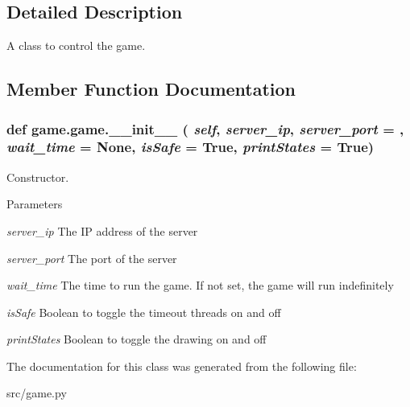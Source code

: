 \subsection{Detailed Description}
A class to control the game. 

\subsection{Member Function Documentation}
\hypertarget{classgame_1_1game_ab012f4d82441309ba1c14872d3ca646d}{
\subsubsection[{\_\-\_\-init\_\-\_\-}]{\setlength{\rightskip}{0pt plus 5cm}def game.game.\_\-\_\-init\_\-\_\- ( {\em self}, \/   {\em server\_\-ip}, \/   {\em server\_\-port} = {}, \/   {\em wait\_\-time} = {\ttfamily None}, \/   {\em isSafe} = {\ttfamily True}, \/   {\em printStates} = {\ttfamily True})}}
\label{classgame_1_1game_ab012f4d82441309ba1c14872d3ca646d}


Constructor. 


\begin{DoxyParams}{Parameters}
\item[{\em server\_\-ip}]The IP address of the server \item[{\em server\_\-port}]The port of the server \item[{\em wait\_\-time}]The time to run the game. If not set, the game will run indefinitely \item[{\em isSafe}]Boolean to toggle the timeout threads on and off \item[{\em printStates}]Boolean to toggle the drawing on and off \end{DoxyParams}


The documentation for this class was generated from the following file:\begin{DoxyCompactItemize}
\item 
src/game.py\end{DoxyCompactItemize}
